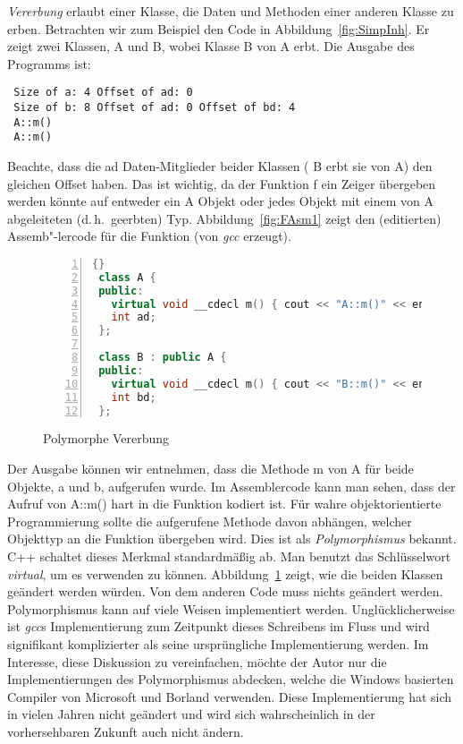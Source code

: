 \emph{Vererbung} erlaubt einer Klasse, die Daten und Methoden einer
anderen Klasse zu erben. Betrachten wir zum Beispiel den Code in
Abbildung~\ref{fig:SimpInh}. Er zeigt zwei Klassen, {\code A} und
{\code B}, wobei Klasse {\code B} von {\code A} erbt. Die Ausgabe
des Programms ist:
\begin{verbatim}
 Size of a: 4 Offset of ad: 0
 Size of b: 8 Offset of ad: 0 Offset of bd: 4
 A::m()
 A::m()
\end{verbatim}
Beachte, dass die {\code ad} Daten-Mitglieder beider Klassen ({\code
B} erbt sie von {\code A}) den gleichen Offset haben. Das ist
wichtig, da der Funktion {\code f} ein Zeiger \"{u}bergeben werden
k\"{o}nnte auf entweder ein {\code A} Objekt oder jedes Objekt mit einem
von {\code A} abgeleiteten (d.\,h.\ geerbten) Typ.
Abbildung~\ref{fig:FAsm1} zeigt den (editierten) Assemb"-lercode f\"{u}r
die Funktion (von \emph{gcc}  erzeugt).

\begin{figure}[tp]
\begin{lstlisting}[language=C++, frame=tlrb, numbers=left]{}
 class A {
 public:
   virtual void __cdecl m() { cout << "A::m()" << endl; }
   int ad;
 };

 class B : public A {
 public:
   virtual void __cdecl m() { cout << "B::m()" << endl; }
   int bd;
 };
\end{lstlisting}
\caption{ Polymorphe Vererbung \label{fig:VirtInh}}
\end{figure}

 Der Ausgabe k\"{o}nnen wir entnehmen, dass
die Methode {\code m} von {\code A} f\"{u}r beide Objekte, {\code a} und
{\code b}, aufgerufen wurde. Im Assemblercode kann man sehen, dass
der Aufruf von {\code A::m()} hart in die Funktion kodiert ist. F\"{u}r
wahre objektorientierte Programmierung sollte die aufgerufene
Methode davon abh\"{a}ngen, welcher Objekttyp an die Funktion \"{u}bergeben
wird. Dies ist als \emph{Polymorphismus} bekannt. C++ schaltet
dieses Merkmal standardm\"{a}{\ss}ig ab. Man benutzt das Schl\"{u}sselwort
\emph{virtual},  um es verwenden zu k\"{o}nnen.
Abbildung~\ref{fig:VirtInh} zeigt, wie die beiden Klassen ge\"{a}ndert
werden w\"{u}rden. Von dem anderen Code muss nichts ge\"{a}ndert werden.
Polymorphismus kann auf viele Weisen implementiert werden.
Ungl\"{u}cklicherweise ist \emph{gcc}s 
Implementierung zum Zeitpunkt dieses Schreibens im Fluss und wird
signifikant komplizierter als seine urspr\"{u}ngliche Implementierung
werden. Im Interesse, diese Diskussion zu vereinfachen, m\"{o}chte der
Autor nur die Implementierungen des Polymorphismus abdecken, welche
die Windows basierten Compiler von Microsoft
 und Borland 
verwenden. Diese Implementierung hat sich in vielen Jahren nicht
ge\"{a}ndert und wird sich wahrscheinlich in der vorhersehbaren Zukunft
auch nicht \"{a}ndern.

